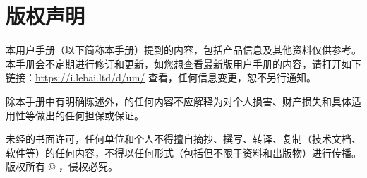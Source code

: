 \chapter*{版权声明}
\thispagestyle{empty}
{
\small

本用户手册（以下简称本手册）提到的内容，包括产品信息及其他资料仅供参考。本手册会不定期进行修订和更新，如您想查看最新版用户手册的内容，请打开如下链接：\url{https://i.lebai.ltd/d/um/} 查看{\eBook}，任何信息变更，恕不另行通知。

除本手册中有明确陈述外，{\ThisBook}的任何内容不应解释为{\Company}对个人损害、财产损失和具体适用性等做出的任何担保或保证。

未经{\Company}的书面许可，任何单位和个人不得擅自摘抄、撰写、转译、复制{\ThisBook}（技术文档、软件等）的任何内容，不得以任何形式（包括但不限于资料和出版物）进行传播。\\

版权所有 © {\Company}，侵权必究。
}